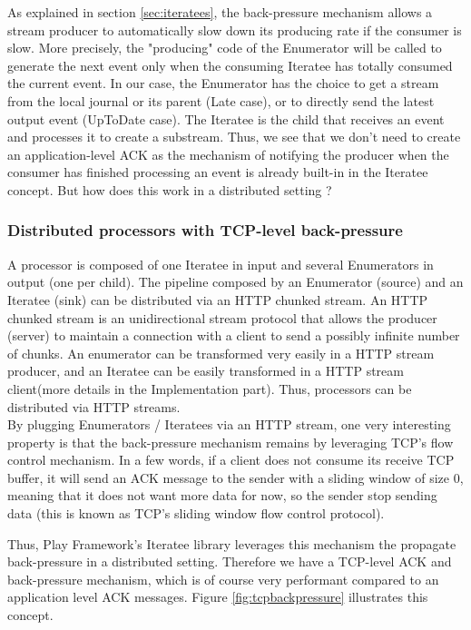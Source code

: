 As explained in section \ref{sec:iteratees}, the back-pressure mechanism allows a stream producer to automatically slow down its producing rate if the consumer is slow. 
More precisely, the "producing" code of the Enumerator will be called to generate the next event only when the consuming Iteratee has totally consumed the current event.
In our case, the Enumerator has the choice to get a stream from the local journal or its parent (Late case), or to directly send the latest output event (UpToDate case).
The Iteratee is the child that receives an event and processes it to create a substream.
Thus, we see that we don't need to create an application-level ACK as the mechanism of notifying the producer when the consumer has finished processing an event is already
built-in in the Iteratee concept. But how does this work in a distributed setting ?


\subsubsection{Distributed processors with TCP-level back-pressure}

A processor is composed of one Iteratee in input and several Enumerators in output (one per child). The pipeline composed by an Enumerator (source) and an Iteratee (sink) can
be distributed via an HTTP chunked stream. An HTTP chunked stream is an unidirectional stream protocol that allows the producer (server) to maintain a connection with a client to send a possibly infinite number of chunks. An enumerator can be transformed very easily in a HTTP stream producer, and an Iteratee can be easily transformed in a HTTP stream client(more details in the Implementation part). Thus, processors can be distributed via HTTP streams.
\\

By plugging Enumerators / Iteratees via an HTTP stream, one very interesting property is that the back-pressure mechanism remains by leveraging TCP's flow control mechanism. In a few words, if a client does not consume its receive TCP buffer, it will send an ACK message to the sender with a sliding window of size 0, meaning that it does not want more data for now, so the sender stop sending data (this is known as TCP's sliding window flow control protocol).

Thus, Play Framework's Iteratee library leverages this mechanism the propagate back-pressure in a distributed setting. Therefore we have a TCP-level ACK and back-pressure mechanism, which is of course very performant compared to an application level ACK messages. Figure \ref{fig:tcpbackpressure} illustrates this concept.


